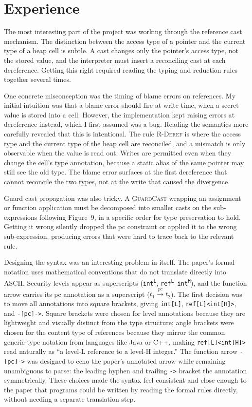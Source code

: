 \documentclass[11pt,a4paper]{article}
\begin{document}
\section{Experience}

The most interesting part of the project was working through the reference cast mechanism.
The distinction between the access type of a pointer and the current type of a heap cell is
subtle. A cast changes only the pointer's access type, not the stored value, and the
interpreter must insert a reconciling cast at each dereference. Getting this right required
reading the typing and reduction rules together several times.

One concrete misconception was the timing of blame errors on references. My initial intuition
was that a blame error should fire at write time, when a secret value is stored into a cell.
However, the implementation kept raising errors at dereference instead, which I first assumed
was a bug. Reading the semantics more carefully revealed that this is intentional. The rule
\textsc{R-Deref} is where the access type and the current type of the heap cell are
reconciled, and a mismatch is only observable when the value is read out. Writes are
permitted even when they change the cell's type annotation, because a static alias of the
same pointer may still see the old type. The blame error surfaces at the first dereference
that cannot reconcile the two types, not at the write that caused the divergence.

Guard cast propagation was also tricky. A \textsc{GuardCast} wrapping an assignment or
function application must be decomposed into smaller casts on the sub-expressions following
Figure~9, in a specific order for type preservation to hold. Getting it wrong silently
dropped the pc constraint or applied it to the wrong sub-expression, producing errors that
were hard to trace back to the relevant rule.

Designing the syntax was an interesting problem in itself. The paper's formal notation
uses mathematical conventions that do not translate directly into ASCII. Security levels appear
as superscripts (\texttt{int\textsuperscript{L}}, \texttt{ref\textsuperscript{L}
int\textsuperscript{H}}), and the function arrow carries its pc annotation as a superscript
($t_1 \xrightarrow{pc} t_2$). The first decision was to move all annotations into square
brackets, giving \texttt{int[L]}, \texttt{ref[L]<int[H]>}, and \texttt{-[pc]->}. Square
brackets were chosen for level annotations because they are lightweight and visually distinct
from the type structure; angle brackets were chosen for the content type of references because
they mirror the common generic-type notation from languages like Java or C++, making
\texttt{ref[L]<int[H]>} read naturally as ``a level-L reference to a level-H integer.''
The function arrow \texttt{-[pc]->} was designed to echo the paper's annotated arrow while
remaining unambiguous to parse: the leading hyphen and trailing \texttt{->} bracket the
annotation symmetrically. These choices made the syntax feel consistent and close enough to
the paper that programs could be written by reading the formal rules directly, without
needing a separate translation step.
\end{document}
